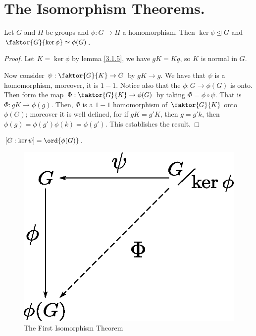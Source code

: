 \section{The Isomorphism Theorems.}
\label{section1}

\begin{theorem}\label{3.4.1}
    Let $G$ and  $H$ be groups and  $\phi:G \rightarrow H$ a homomorphism. Then
    $\ker{\phi} \unlhd G$ and $\faktor{G}{\ker{\phi}} \simeq \phi(G)$.
\end{theorem}
\begin{proof}
    Let $K=\ker{\phi}$ by lemma \ref{3.1.5}, we have $gK=Kg$, so  $K$ is normal
    in  $G$.

    Now consider $\psi:\faktor{G}{K} \rightarrow G$ by $gK \rightarrow g$. We
    have that $\psi$ is a homomorphism, moreover, it is $1-1$. Notice also that
    the $\phi:G \rightarrow \phi(G)$ is onto. Then form the map
    $\Phi:\faktor{G}{K} \rightarrow \phi(G)$ by taking $\Phi = \phi \circ \psi$.
    That is  $\Phi:gK \rightarrow \phi(g)$. Then, $\Phi$ is a $1-1$ homomorphism
    of  $\faktor{G}{K}$ onto $\phi(G)$; moreover it is well defined, for if
    $gK=g'K$, then  $g=g'k$, then  $\phi(g)=\phi(g')\phi(k)=\phi(g')$. This
    establishes the result.
\end{proof}
\begin{corollary}
    $[G : \ker{\psi}] = \ord{\phi(G)}$.
\end{corollary}
 \begin{figure}[h]
     \centering
     \includegraphics[scale = 0.5]{Figures/Chapter3/first_iso_thm.eps}
     \caption{The First Isomorphism Theorem}
     \label{fig_3.2}
 \end{figure}

